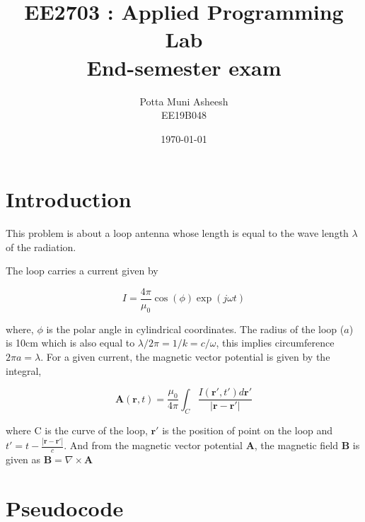 \documentclass[12pt, a4paper]{article}
\title{\textbf{EE2703 : Applied Programming Lab \\ End-semester exam}} %
\author{Potta Muni Asheesh \\ EE19B048} %
\date{\today} %
\begin{document}
	
		
\maketitle %

\section{Introduction}

This problem is about a loop antenna whose length is equal to the wave length $\lambda$ of the radiation.

The loop carries a current given by

\begin{equation*}
I = \frac{4\pi}{\mu_0}\cos(\phi)\exp(j\omega t)
\end{equation*}

where, $\phi$ is the polar angle in cylindrical coordinates. The radius of the loop ($a$) is 10cm which is also equal to $\lambda/2\pi = 1/k = c/\omega$, this implies circumference $2\pi a = \lambda$. For a given current, the magnetic vector potential is given by the integral,

\begin{equation*}
\boldsymbol{A}(\boldsymbol{r}, t) = \frac{\mu_0}{4\pi} \int_C \frac{I(\boldsymbol{r'}, t') d\boldsymbol{r'}}{|\boldsymbol{r} - \boldsymbol{r'}|}
\end{equation*}

where C is the curve of the loop, $\boldsymbol{r'}$ is the position of point on the loop and $t' = t - \frac{|\boldsymbol{r} - \boldsymbol{r'}|}{c}$. And from the magnetic vector potential $\boldsymbol{A}$, the magnetic field $\boldsymbol{B}$ is given as $\boldsymbol{B} = \nabla \times \boldsymbol{A}$

\section{Pseudocode}
\end{document}
